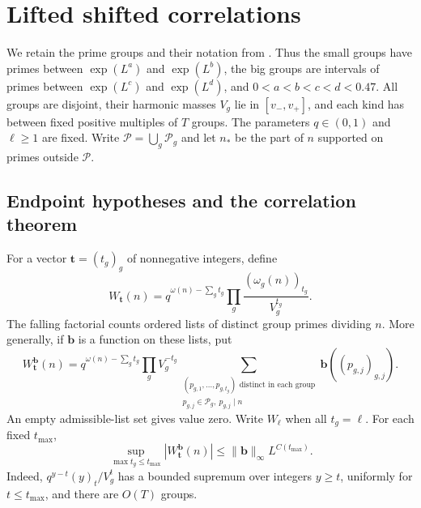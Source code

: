 \section{Lifted shifted correlations}\label{sec:shifts}

We retain the prime groups and their notation from
. Thus the small groups have primes between
$\exp(L^a)$ and $\exp(L^b)$, the big groups are intervals of primes between
$\exp(L^c)$ and $\exp(L^d)$, and
$0<a<b<c<d<0.47$. All groups are disjoint, their harmonic masses
$V_g$ lie in $[v_-,v_+]$, and each kind has between fixed positive
multiples of $T$ groups. The parameters $q\in(0,1)$ and $\ell\geq1$
are fixed. Write $\mathcal P=\bigcup_g\mathcal P_g$ and let $n_*$ be the
part of $n$ supported on primes outside $\mathcal P$.

\subsection{Endpoint hypotheses and the correlation theorem}

For a vector $\mathbf t=(t_g)_g$ of nonnegative integers, define
\begin{equation}\label{eq:marked-weight}
 W_{\mathbf t}(n)=q^{\omega(n)-\sum_g t_g}
       \prod_g\frac{(\omega_g(n))_{t_g}}{V_g^{t_g}}.
\end{equation}
The falling factorial counts ordered lists of distinct group primes
dividing $n$. More generally, if $\mathbf b$ is a function on these lists,
put
\[
 W_{\mathbf t}^{\mathbf b}(n)=
 q^{\omega(n)-\sum_g t_g}
 \prod_g V_g^{-t_g}
 \sum_{\substack{(p_{g,1},\ldots,p_{g,t_g})\text{ distinct in each group}\\
                  p_{g,j}\in\mathcal P_g,\ p_{g,j}\mid n}}
                  \mathbf b((p_{g,j})_{g,j}).
\]
An empty admissible-list set gives value zero. Write $W_\ell$ when all
$t_g=\ell$. For each fixed $t_{\max}$,
\begin{equation}\label{eq:mark-sup}
 \sup_{\max t_g\leq t_{\max}}
       |W_{\mathbf t}^{\mathbf b}(n)|
 \leq \|\mathbf b\|_\infty L^{C(t_{\max})}.
\end{equation}
Indeed, $q^{y-t}(y)_t/V_g^t$ has a bounded supremum over integers $y\geq t$,
uniformly for $t\leq t_{\max}$, and there are $O(T)$ groups.

